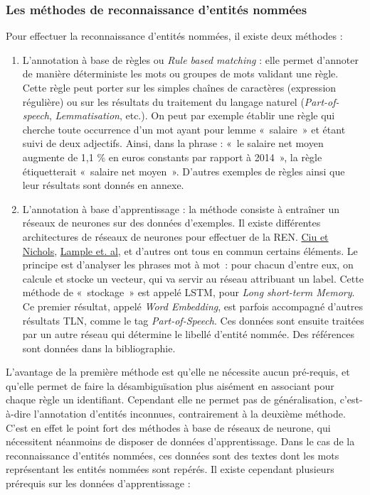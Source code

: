 \subsubsection*{Les méthodes de reconnaissance d'entités nommées}
Pour effectuer la reconnaissance d'entités nommées, il existe deux méthodes : 
\begin{enumerate}
    \item L'annotation à base de règles ou \textit{Rule based matching} : elle permet d'annoter de manière déterministe les mots ou groupes de mots validant une règle. Cette règle peut porter sur les simples chaînes de caractères (expression régulière) ou sur les résultats du traitement du langage naturel (\textit{Part-of-speech}, \textit{Lemmatisation}, etc.). On peut par exemple établir une règle qui cherche toute occurrence d'un mot ayant pour lemme «~salaire~» et étant suivi de deux adjectifs. Ainsi, dans la phrase : «~le salaire net moyen augmente de 1,1 \% en euros constants par rapport à 2014~», la règle étiquetterait «~salaire net moyen~». D'autres exemples de règles ainsi que leur résultats sont donnés en annexe.
    \vspace{5pt}
    \item L'annotation à base d'apprentissage : la méthode consiste à entraîner un réseaux de neurones sur des données d'exemples. Il existe différentes architectures de réseaux de neurones pour effectuer de la REN. \href{https://www.aclweb.org/anthology/Q16-1026}{Ciu et Nichols}, \href{https://www.aclweb.org/anthology/N16-1030}{Lample et. al}, et d'autres ont tous en commun certains éléments. Le principe est d'analyser les phrases mot à mot~: pour chacun d'entre eux, on calcule et stocke un vecteur, qui va servir au réseau attribuant un label. Cette méthode de «~stockage~» est appelé LSTM, pour \textit{Long short-term Memory}. Ce premier résultat, appelé \textit{Word Embedding}, est parfois accompagné d'autres résultats TLN, comme le tag \textit{Part-of-Speech}. Ces données sont ensuite traitées par un autre réseau qui détermine le libellé d'entité nommée. Des références sont données dans la bibliographie.
    \newline
\end{enumerate}

L'avantage de la première méthode est qu'elle ne nécessite aucun pré-requis, et qu'elle permet de faire la désambiguïsation plus aisément en associant pour chaque règle un identifiant. Cependant elle ne permet pas de généralisation, c'est-à-dire l'annotation d'entités inconnues, contrairement à la deuxième méthode. C'est en effet le point fort des méthodes à base de réseaux de neurone, qui nécessitent néanmoins de disposer de données d'apprentissage. Dans le cas de la reconnaissance d'entités nommées, ces données sont des textes dont les mots représentant les entités nommées sont repérés. Il existe cependant plusieurs prérequis sur les données d'apprentissage :
\newline

